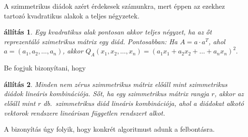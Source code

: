 \documentclass[9pt, a4paper, showtrims]{memoir}
\theoremstyle{plain}
\newtheorem{proposition}{állítás}[chapter]
\theoremstyle{remark}
\theoremstyle{definition}
\begin{document}
A szimmetrikus diádok azért érdekesek számunkra, 
mert éppen az ezekhez tartozó kvadratikus alakok a teljes négyzetek.
\begin{proposition}
   Egy kvadratikus alak pontosan akkor teljes négyzet, ha az őt reprezentáló szimetrikus mátrix egy diád.
   Pontosabban:
   Ha $A=a\cdot a^T$, ahol $a=\left( a_1,a_2,\ldots,a_n \right)$, akkor
      \(
         Q_A\left( x_1,x_2,\ldots,x_n \right)=
         \left( a_1x_1+a_2x_2+\ldots+a_nx_n \right)^2.
      \)
\end{proposition}
Be fogjuk bizonyítani, hogy 
\begin{proposition}
    Minden nem zérus szimmetrikus mátrix előáll mint szimmetrikus diádok lineáris kombinációja.
    Sőt, ha egy szimmetrikus mátrix rangja $r$, 
    akkor az előáll mint $r$ db.~szimmetrikus diád lineáris kombinációja, 
    ahol a diádokat alkotó vektorok rendszere lineárisan független rendszert alkot.
\end{proposition}
A bizonyítás úgy folyik, hogy konkrét algoritmust adunk a felbontásra.
\end{document}
